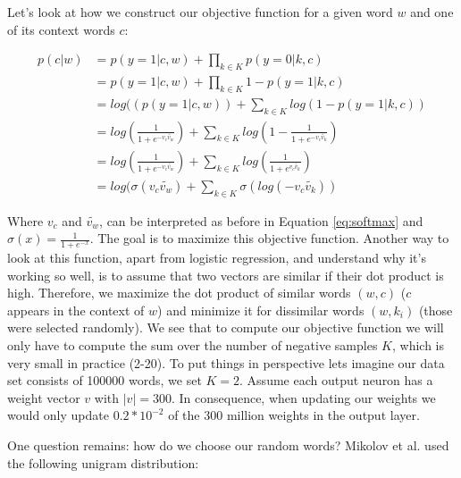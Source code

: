 Let's look at how we construct our objective function for a given word $w$ and one of its context words $c$:

\begin{align*}
p(c|w) &= p(y=1|c,w) + \prod_{k\in K} p(y=0|k,c)
\\&= p(y=1|c,w) + \prod_{k\in K} 1- p(y=1|k,c)
\\&= log((p(y=1|c,w)) + \sum_{k\in K} log(1- p(y=1|k,c))
\\&= log(\frac{1}{1+e^{-v_c \tilde{v_w }}}) + \sum_{k\in K} log(1-\frac{1}{1+e^{-v_c \tilde{v_k}}})
\\&= log(\frac{1}{1+e^{-v_c \tilde{v_w } }}) + \sum_{k\in K} log(\frac{1}{1+e^{v_c \tilde{v_k} }})
\\&= log(\sigma(v_c \tilde{v_w } ) + \sum_{k\in K} \sigma(log(-v_c \tilde{v_k} ))
\end{align*}\label{eq:obj_neg_samples}

Where $v_c$ and $\tilde{v_w }$, can be interpreted as before in Equation \ref{eq:softmax} and $\sigma(x) = \frac{1}{1+e^{-x}}$. The goal is to maximize this objective function. Another way to look at this function, apart from logistic regression, and understand why it's working so well, is to assume that two vectors are similar if their dot product is high. Therefore, we maximize the dot product of similar words $(w,c)$ ($c$ appears in the context of $w$) and minimize it for dissimilar words $(w,k_i)$ (those were selected randomly).
We see that to compute our objective function we will only have to compute the sum over the number of negative samples $K$, which is very small in practice (2-20). To put things in perspective lets imagine our data set consists of 100000 words, we set $K=2$. Assume each output neuron has a weight vector $v$ with $|v| = 300$. In consequence, when updating our weights we would only update $0.2*10^{-2}$ of the 300 million weights in the output layer.

One question remains: how do we choose our random words? Mikolov et al. \cite{mikolov2} used the following unigram distribution:


